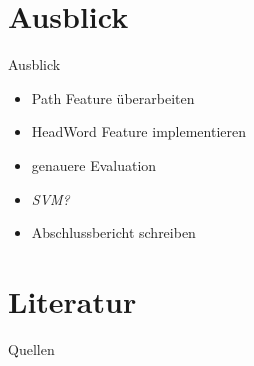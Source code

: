\documentclass[10pt]{beamer}
\begin{document}
\section{Ausblick}

\begin{frame}{Ausblick}

\begin{itemize}
	\item Path Feature überarbeiten
	\item HeadWord Feature implementieren
	\item genauere Evaluation
	\item \textit{SVM?}
	\item Abschlussbericht schreiben
\end{itemize}

\end{frame}
\section{Literatur}
\begin{frame}{Quellen}
    \renewcommand*{\refname}{Referenzen}
    \nocite{*} 
    \printbibliography 
\end{frame} 

{\aauwavesbg
\begin{frame}
\end{frame}}
\end{document}
